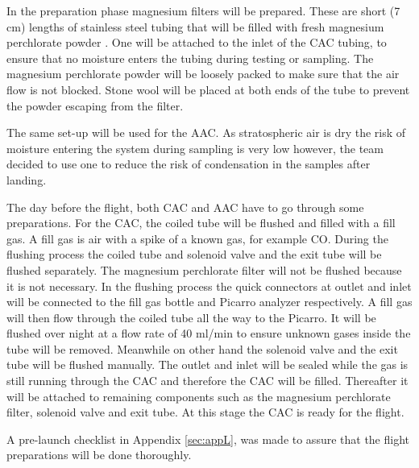 \documentclass[a4paper,12pt,twoside]{article}
\begin{document}
In the preparation phase magnesium filters will be prepared. These are short (7 cm) lengths of stainless steel tubing that will be filled with fresh magnesium perchlorate powder \cite{Karion}. One will be attached to the inlet of the CAC tubing, to ensure that no moisture enters the tubing during testing or sampling. The magnesium perchlorate powder will be loosely packed to make sure that the air flow is not blocked. Stone wool will be placed at both ends of the tube to prevent the powder escaping from the filter.

The same set-up will be used for the AAC. As stratospheric air is dry the risk of moisture entering the system during sampling is very low however, the team decided to use one to reduce the risk of condensation in the samples after landing. 

The day before the flight, both CAC and AAC have to go through some preparations. For the CAC, the coiled tube will be flushed and filled with a fill gas. A fill gas is air with a spike of a known gas, for example CO. During the flushing process the coiled tube and solenoid valve and the exit tube will be flushed separately. The magnesium perchlorate filter will not be flushed because it is not necessary. In the flushing process the quick connectors at outlet and inlet will be connected to the fill gas bottle and Picarro analyzer respectively. A fill gas will then flow through the coiled tube all the way to the Picarro. It will be flushed over night at a flow rate of 40 ml/min to ensure unknown gases inside the tube will be removed. Meanwhile on other hand the solenoid valve and the exit tube will be flushed manually. The outlet and inlet will be sealed while the gas is still running through the CAC and therefore the CAC will be filled. Thereafter it will be attached to remaining components such as the magnesium perchlorate filter, solenoid valve and exit tube. At this stage the CAC is ready for the flight. 

A pre-launch checklist in Appendix \ref{sec:appL}, was made to assure that the flight preparations will be done thoroughly. 
\end{document}
